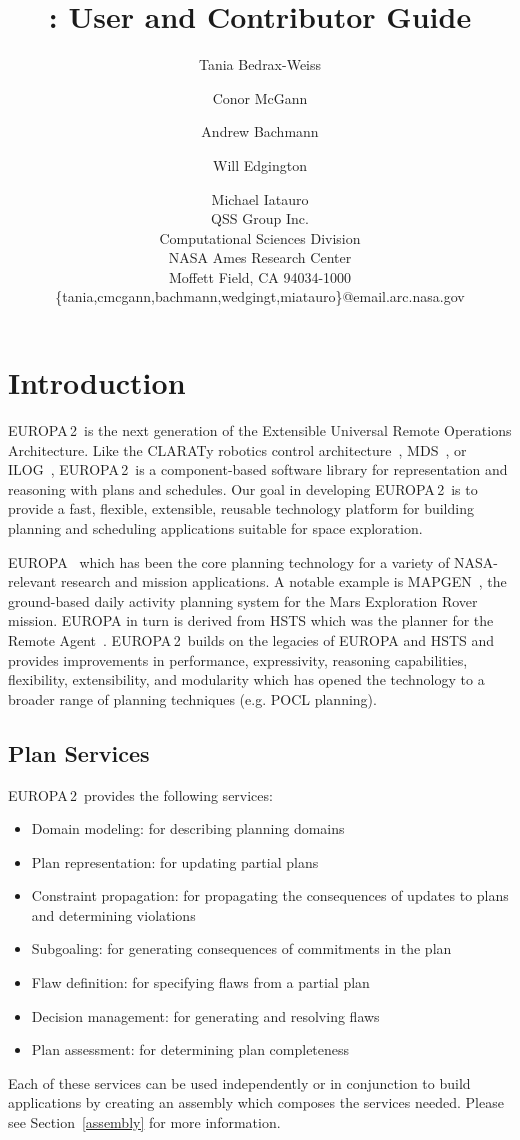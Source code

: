 \documentclass[10pt, letterpaper, twoside]{article}
\author{Tania Bedrax-Weiss \and Conor McGann \and Andrew Bachmann \and Will Edgington \and Michael Iatauro \\
QSS Group Inc. \\
Computational Sciences Division \\
NASA Ames Research Center \\
Moffett Field, CA 94034-1000 \\
\{tania,cmcgann,bachmann,wedgingt,miatauro\}@email.arc.nasa.gov
}
\title{\ET: User and Contributor Guide}
\begin{document}
\newcommand{\ET}{EUROPA\,2}

\maketitle

\tableofcontents

\section{Introduction}
\label{intro}
\ET\, is the next generation of the Extensible Universal Remote
Operations Architecture.  Like the CLARATy robotics control
architecture~\cite{kn:Ne}, MDS~\cite{MDS}, or ILOG~\cite{ILOG}, \ET\, is a 
component-based software library for representation and reasoning with
plans and schedules. Our goal in developing \ET\, is to provide a fast,
flexible, extensible, reusable technology platform for building planning
and scheduling applications suitable for space exploration.

EUROPA~\cite{caip,interplanetary} which has been the core planning
technology for a variety of NASA-relevant research and mission
applications. A notable example is MAPGEN~\cite{mapgen1,mapgen2}, the
ground-based daily activity planning system for the Mars Exploration Rover
mission. EUROPA in turn is derived from HSTS which was the planner for the
Remote Agent~\cite{rax}. \ET\, builds on the legacies of EUROPA and HSTS
and provides improvements in performance, expressivity, reasoning
capabilities, flexibility, extensibility, and modularity which has opened
the technology to a broader range of planning techniques (e.g. POCL
planning).

\subsection{Plan Services}
\label{services}
\ET\, provides the following services:
\begin{itemize}
\item Domain modeling: for describing planning domains
\item Plan representation: for updating partial plans 
\item Constraint propagation: for propagating the consequences of updates
to plans and determining violations
\item Subgoaling: for generating consequences of commitments in the plan
\item Flaw definition: for specifying flaws from a partial plan
\item Decision management: for generating and resolving flaws
\item Plan assessment: for determining plan completeness
\end{itemize}
Each of these services can be used independently or in conjunction to build
applications by creating an assembly which composes the services
needed. Please see Section~\ref{assembly} for more information.
\end{document}
